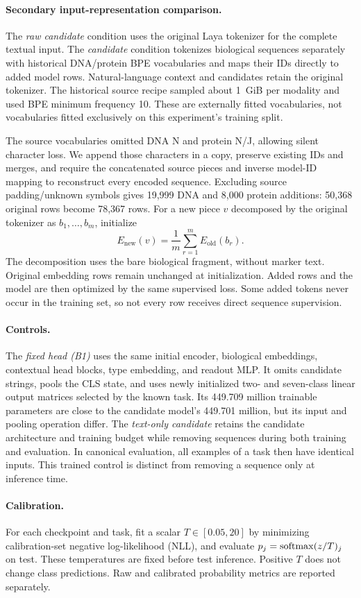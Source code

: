 \paragraph{Secondary input-representation comparison.}
The \emph{raw candidate} condition uses the original Laya tokenizer for the complete textual input. The \emph{\BioBPE{} candidate} condition tokenizes biological sequences separately with historical DNA/protein BPE vocabularies and maps their IDs directly to added model rows. Natural-language context and candidates retain the original tokenizer. The historical source recipe sampled about 1~GiB per modality and used BPE minimum frequency 10. These are externally fitted vocabularies, not vocabularies fitted exclusively on this experiment's training split.

The source vocabularies omitted DNA N and protein N/J, allowing silent character loss. We append those characters in a copy, preserve existing IDs and merges, and require the concatenated source pieces and inverse model-ID mapping to reconstruct every encoded sequence. Excluding source padding/unknown symbols gives 19,999 DNA and 8,000 protein additions: 50,368 original rows become 78,367 rows. For a new piece $v$ decomposed by the original tokenizer as $b_1,\ldots,b_m$, initialize
\begin{equation}
E_{\mathrm{new}}(v)=\frac1m\sum_{r=1}^{m}E_{\mathrm{old}}(b_r).
\end{equation}
The decomposition uses the bare biological fragment, without marker text. Original embedding rows remain unchanged at initialization. Added rows and the model are then optimized by the same supervised loss. Some added tokens never occur in the training set, so not every row receives direct sequence supervision.

\paragraph{Controls.}
The \emph{\BioBPE{} fixed head (B1)} uses the same initial encoder, biological embeddings, contextual head blocks, type embedding, and readout MLP. It omits candidate strings, pools the CLS state, and uses newly initialized two- and seven-class linear output matrices selected by the known task. Its 449.709 million trainable parameters are close to the candidate model's 449.701 million, but its input and pooling operation differ. The \emph{text-only candidate} retains the candidate architecture and training budget while removing sequences during both training and evaluation. In canonical evaluation, all examples of a task then have identical inputs. This trained control is distinct from removing a sequence only at inference time.

\paragraph{Calibration.}
For each checkpoint and task, fit a scalar $T\in[0.05,20]$ by minimizing calibration-set negative log-likelihood (NLL), and evaluate $p_j=\operatorname{softmax}(z/T)_j$ on test. These temperatures are fixed before test inference. Positive $T$ does not change class predictions. Raw and calibrated probability metrics are reported separately.
